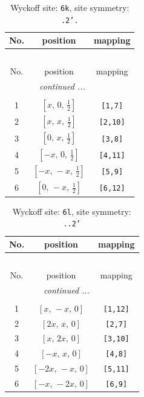 \documentclass[fleqn,8pt]{jsarticle}
\begin{document}
\renewcommand{\arraystretch}{1.2}
\begin{longtable}{ccc}
\caption{Wyckoff site: {\tt 6k}, site symmetry: {\tt .2'.}}
 \\
 \hline \hline
No. & position & mapping \\ \hline \endfirsthead

\multicolumn{2}{l}{\tablename\ \thetable{}} \\
 \hline \hline
No. & position & mapping \\ \hline \endhead

 \hline \hline
\multicolumn{2}{r}{\footnotesize\it continued ...} \\ \endfoot

 \hline \hline
\multicolumn{2}{r}{} \\ \endlastfoot

1 & $\left[ x,\, 0,\, \frac{1}{2} \right]$ & {\tt [1,7]} \\ \hline
2 & $\left[ x,\, x,\, \frac{1}{2} \right]$ & {\tt [2,10]} \\ \hline
3 & $\left[ 0,\, x,\, \frac{1}{2} \right]$ & {\tt [3,8]} \\ \hline
4 & $\left[ - x,\, 0,\, \frac{1}{2} \right]$ & {\tt [4,11]} \\ \hline
5 & $\left[ - x,\, - x,\, \frac{1}{2} \right]$ & {\tt [5,9]} \\ \hline
6 & $\left[ 0,\, - x,\, \frac{1}{2} \right]$ & {\tt [6,12]} \\
\end{longtable}
\renewcommand{\arraystretch}{1.2}
\begin{longtable}{ccc}
\caption{Wyckoff site: {\tt 6l}, site symmetry: {\tt ..2'}}
 \\
 \hline \hline
No. & position & mapping \\ \hline \endfirsthead

\multicolumn{2}{l}{\tablename\ \thetable{}} \\
 \hline \hline
No. & position & mapping \\ \hline \endhead

 \hline \hline
\multicolumn{2}{r}{\footnotesize\it continued ...} \\ \endfoot

 \hline \hline
\multicolumn{2}{r}{} \\ \endlastfoot

1 & $\left[ x,\, - x,\, 0 \right]$ & {\tt [1,12]} \\ \hline
2 & $\left[ 2 x,\, x,\, 0 \right]$ & {\tt [2,7]} \\ \hline
3 & $\left[ x,\, 2 x,\, 0 \right]$ & {\tt [3,10]} \\ \hline
4 & $\left[ - x,\, x,\, 0 \right]$ & {\tt [4,8]} \\ \hline
5 & $\left[ - 2 x,\, - x,\, 0 \right]$ & {\tt [5,11]} \\ \hline
6 & $\left[ - x,\, - 2 x,\, 0 \right]$ & {\tt [6,9]} \\
\end{longtable}
\end{document}
